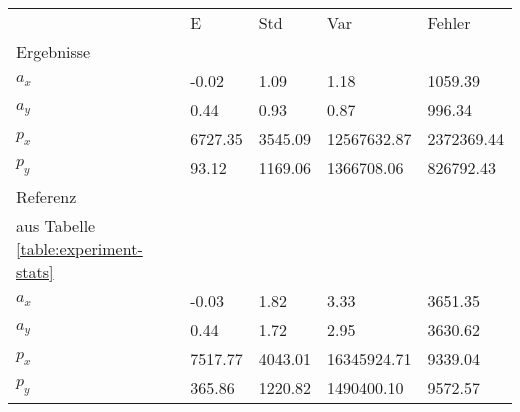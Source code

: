 \begin{tabular}{l|l|l|l|l}

     & E   & Std    & Var    & Fehler \\
\hhline{=|=|=|=|=}

Ergebnisse & & & & \\
$a_x$  &        -0.02 &         1.09 &         1.18 &      1059.39 \\
$a_y$  &         0.44 &         0.93 &         0.87 &       996.34 \\
$p_x$  &      6727.35 &      3545.09 &  12567632.87 &   2372369.44 \\
$p_y$  &        93.12 &      1169.06 &   1366708.06 &    826792.43 \\

\hline
Referenz & & & & \\
aus Tabelle  \ref{table:experiment-stats} & & & & \\
$a_x$  &        -0.03 &         1.82 &         3.33 &      3651.35 \\
$a_y$  &         0.44 &         1.72 &         2.95 &      3630.62 \\
$p_x$  &      7517.77 &      4043.01 &  16345924.71 &      9339.04 \\
$p_y$  &       365.86 &      1220.82 &   1490400.10 &      9572.57 \\
\end{tabular}
